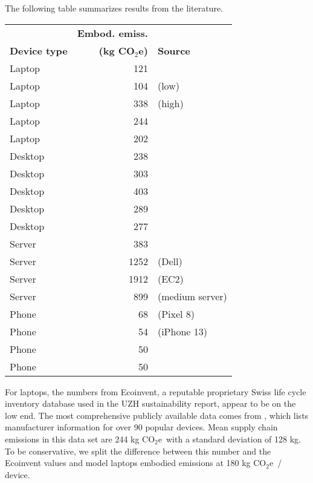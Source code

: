 \documentclass[11pt]{article}
\newcommand{\coe}{CO$_2$e}
\newcommand{\gcoe}{g \coe}
\newcommand{\kgcoe}{k\gcoe}
\begin{document}
The following table summarizes results from the literature.

\begin{center}
\begin{tabular}{|l|r|l|}
\hline
& \textbf{Embod. emiss.} & \\
\textbf{Device type} & \textbf{(\kgcoe)} & \textbf{Source} \\ \hline
Laptop & 121 & \textcite{ecoinvent}  \\ \hline
Laptop & 104 & \textcite{teehan2013} (low) \\ \hline
Laptop & 338 & \textcite{teehan2013} (high) \\ \hline
Laptop & 244 & \textcite{rarecoil} \\ \hline
Laptop & 202 & \textcite{unctadder2024} \\ \hline
Desktop & 238 & \textcite{ecoinvent} \\ \hline
Desktop & 303 & \textcite{teehan2013} \\ \hline
Desktop & 403 & \textcite{unctadder2024} \\ \hline
Desktop & 289 & \textcite{dellpcf} \\ \hline
Desktop & 277 & \textcite{boavizta} \\ \hline
Server & 383 & \textcite{teehan2013} \\ \hline
Server & 1252 & \textcite{davy2021} (Dell) \\ \hline
Server & 1912 & \textcite{davy2021} (EC2) \\ \hline
Server & 899 & \textcite{boavizta} (medium server)\\ \hline
Phone & 68 & \textcite{googlepixel8} (Pixel 8)\\ \hline
Phone & 54 & \textcite{appleiphone13} (iPhone 13)\\ \hline
Phone & 50 & \textcite{unctadder2024} \\ \hline
Phone & 50 & \textcite{lovehagen2023} \\ \hline
\end{tabular}
\label{tab:embodied_emissions}
\end{center}

For laptops, the numbers from Ecoinvent, a reputable proprietary Swiss life cycle inventory database used in the UZH sustainability report, appear to be on the low end. The most comprehensive publicly available data comes from \textcite{rarecoil}, which lists manufacturer information for over 90 popular devices. Mean supply chain emissions in this data set are 244 \kgcoe\ with a standard deviation of 128 kg. To be conservative, we split the difference between this number and the Ecoinvent values and model laptops embodied emissions at 180 \kgcoe\ / device.
\end{document}
